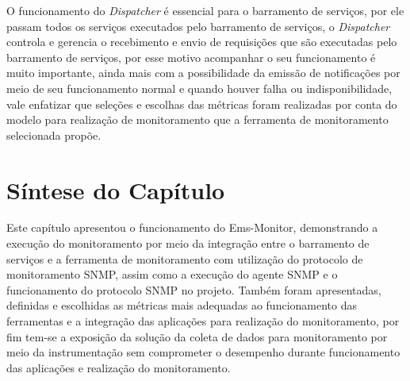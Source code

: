 O funcionamento do \textit{Dispatcher} é essencial para o barramento de serviços, por ele passam todos os serviços executados pelo barramento de serviços, o \textit{Dispatcher} controla e gerencia o recebimento e envio de requisições que são executadas pelo barramento de serviços, por esse motivo acompanhar o seu funcionamento é muito importante, ainda mais com a possibilidade da emissão de notificações por meio de seu funcionamento normal e quando houver falha ou indisponibilidade, vale enfatizar que seleções e escolhas das métricas foram realizadas por conta do modelo para realização de monitoramento que a ferramenta de monitoramento selecionada propõe.   


\section{Síntese do Capítulo}
\label{sintese4}

Este capítulo apresentou o funcionamento do Ems-Monitor, demonstrando a execução do monitoramento por meio da integração entre o barramento de serviços e a ferramenta de monitoramento com utilização do protocolo de monitoramento \acrshort{SNMP}, assim como a execução do agente \acrshort{SNMP} e o funcionamento do protocolo \acrshort{SNMP} no projeto. Também foram apresentadas, definidas e escolhidas as métricas mais adequadas ao funcionamento das ferramentas e a integração das aplicações para realização do monitoramento, por fim tem-se a exposição da solução da coleta de dados para monitoramento por meio da instrumentação sem comprometer o desempenho durante funcionamento das aplicações e realização do monitoramento. 